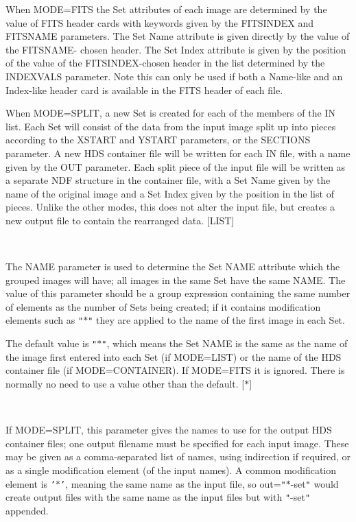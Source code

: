 \documentclass[twoside,11pt]{article}
\renewcommand{\_}{\texttt{\symbol{95}}}
\newcommand{\sstsubsection}[1]{ \item[{#1}] \mbox{} \\}
\newcommand{\sstsubsection}[1]{\item[{#1}]}
\begin{document}
{{{         When MODE=FITS the Set attributes of each image are determined
         by the value of FITS header cards with keywords given by
         the FITSINDEX and FITSNAME parameters.  The Set Name
         attribute is given directly by the value of the FITSNAME-
         chosen header.  The Set Index attribute is given by the
         position of the value of the FITSINDEX-chosen header in
         the list determined by the INDEXVALS parameter.
         Note this can only be used if both a Name-like and an
         Index-like header card is available in the FITS header of
         each file.

         When MODE=SPLIT, a new Set is created for each of the members
         of the IN list.  Each Set will consist of the data from the
         input image split up into pieces according to the XSTART
         and YSTART parameters, or the SECTIONS parameter.
         A new HDS container file will be written for
         each IN file, with a name given by the OUT parameter.  Each
         split piece of the input file will be written as a separate
         NDF structure in the container file, with a Set Name given by the
         name of the original image and a Set Index given by the
         position in the list of pieces.  Unlike the other modes,
         this does not alter the input file, but creates a new output
         file to contain the rearranged data.
         [LIST]
      }
      \sstsubsection{
         NAME = LITERAL (Read)
      }{
         The NAME parameter is used to determine the Set NAME attribute
         which the grouped images will have; all images in the same Set
         have the same NAME.  The value of this parameter should be
         a group expression containing the same number of elements
         as the number of Sets being created; if it contains
         modification elements such as {\tt "}$*${\tt "} they are applied to the
         name of the first image in each Set.

         The default value is {\tt "}$*${\tt "}, which means the Set NAME is the
         same as the name of the image first entered into each Set
         (if MODE=LIST) or the name of the HDS container file
         (if MODE=CONTAINER).  If MODE=FITS it is ignored.  There
         is normally no need to use a value other than the default.
         [$*$]
      }
      \sstsubsection{
         OUT = LITERAL (Read)
      }{
         If MODE=SPLIT, this parameter gives the names to use for the
         output HDS container files; one output filename must be
         specified for each input image.  These may be given as a
         comma-separated list of names, using indirection if required,
         or as a single modification element (of the input names).
         A common modification element is {\tt '}$*${\tt '}, meaning the same name
         as the input file, so out={\tt "}$*$-set{\tt "} would create output
         files with the same name as the input files but with {\tt "}-set{\tt "}
         appended.

}}}
\end{document}
